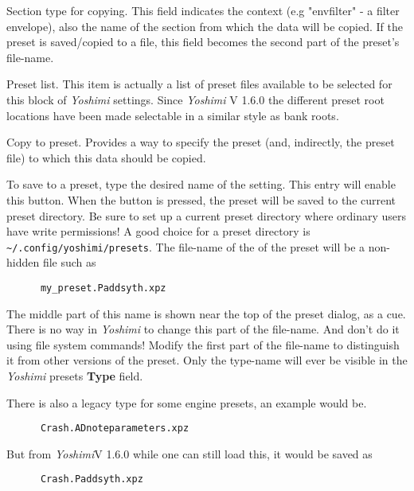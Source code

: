    \setcounter{ItemCounter}{0}      %

   Section type for copying.
   This field indicates the context (e.g "envfilter" - a filter envelope), also the
   name of the section from which the data will be copied.
   If the preset is saved/copied to a file, this field becomes the second part of
   the preset's file-name.

   Preset list.
   This item is actually a list of preset files available to be selected for
   this block of \textsl{Yoshimi} settings. Since \textsl{Yoshimi} V 1.6.0 the
   different preset root locations have been made selectable in a similar style
   as bank roots.

   Copy to preset.
   Provides a way to specify the preset (and, indirectly, the preset file)
   to which this data should be copied.

   To save to a preset, type the desired name of the setting.  This entry
   will enable this button.  When the button is pressed, the preset will
   be saved to the current preset directory.
   Be sure to set up a current preset directory where ordinary users have
   write permissions!
   A good choice for a preset directory is
   \texttt{\textasciitilde/.config/yoshimi/presets}.
   The file-name of the of the preset will be a non-hidden file such as

   \begin{verbatim}
      my_preset.Paddsyth.xpz
   \end{verbatim}

   The middle part of this name is shown near the top of the preset dialog, as
   a cue.
   There is no way in \textsl{Yoshimi} to change this part of the file-name.
   And don't do it using file system commands!  Modify the first part of the
   file-name to distinguish it from other versions of the preset.
   Only the type-name will ever be visible in the \textsl{Yoshimi}
   presets \textbf{Type} field.

   There is also a legacy type for some engine presets, an example would be.
   \begin{verbatim}
      Crash.ADnoteparameters.xpz
   \end{verbatim}
   But from \textsl{Yoshimi}V 1.6.0 while one can still load this, it would be saved as
   \begin{verbatim}
      Crash.Paddsyth.xpz
   \end{verbatim}

